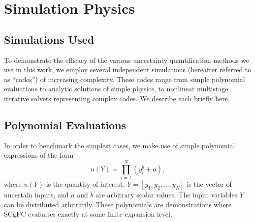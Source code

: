 
\chapter{Simulation Physics} %

\label{Chapter2} %



\section{Simulations Used}
To demonstrate the efficacy of the various uncertainty quantification methods we use in this work, we employ
several independent simulations (hereafter referred to as ``codes'') of increasing complexity.  These codes
range from simple polynomial evaluations to analytic solutions of simple physics, to nonlinear multistage
iterative solvers representing complex codes.  We describe each briefly here.

\section{Polynomial Evaluations}
In order to benchmark the simplest cases, we make use of simple polynomial expressions of the form
\begin{equation}
  u(Y) = \prod_{i=1}^N (y^b_i+a),
\end{equation}
where $u(Y)$ is the quantity of interest, $Y=[y_1,y_2,\ldots,y_N]$ is the vector of uncertain inputs, and $a$
and $b$ are arbitrary scalar values.  The input variables $Y$ can be distributed arbitrarily.
These polynomials are demonstrations where SCgPC evaluates exactly at some
finite expansion level.




